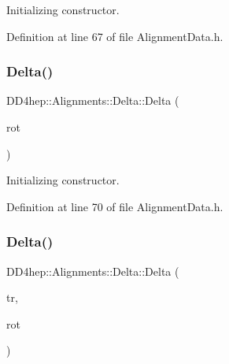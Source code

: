 Initializing constructor. 



Definition at line 67 of file Alignment\+Data.\+h.

\hypertarget{class_d_d4hep_1_1_alignments_1_1_delta_ae692692779f93fe44ddcf501e1e4cdcd}{}\label{class_d_d4hep_1_1_alignments_1_1_delta_ae692692779f93fe44ddcf501e1e4cdcd} 
\subsubsection{\texorpdfstring{Delta()}{Delta()}\hspace{0.1cm}{\footnotesize\ttfamily [3/7]}}
{\footnotesize\ttfamily D\+D4hep\+::\+Alignments\+::\+Delta\+::\+Delta (\begin{DoxyParamCaption}\item[{const Rotation\+Z\+YX \&}]{rot }\end{DoxyParamCaption})\hspace{0.3cm}{\ttfamily [inline]}}



Initializing constructor. 



Definition at line 70 of file Alignment\+Data.\+h.

\hypertarget{class_d_d4hep_1_1_alignments_1_1_delta_a0e678885ecb41d17d6a4d3f2ded6679e}{}\label{class_d_d4hep_1_1_alignments_1_1_delta_a0e678885ecb41d17d6a4d3f2ded6679e} 
\subsubsection{\texorpdfstring{Delta()}{Delta()}\hspace{0.1cm}{\footnotesize\ttfamily [4/7]}}
{\footnotesize\ttfamily D\+D4hep\+::\+Alignments\+::\+Delta\+::\+Delta (\begin{DoxyParamCaption}\item[{const Position \&}]{tr,  }\item[{const Rotation\+Z\+YX \&}]{rot }\end{DoxyParamCaption})\hspace{0.3cm}{\ttfamily [inline]}}



